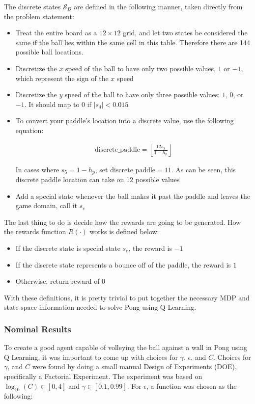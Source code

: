 \documentclass{article}[12pt]
\begin{document}
	The discrete states $\mathcal{S}_D$ are defined in the following manner, taken directly from the problem statement:
	\begin{itemize} 
		\item Treat the entire board as a $12 \times 12$ grid, and let two states be considered the same if the ball lies within the same cell in this table. Therefore there are 144 possible ball locations.
		\item Discretize the $x$ speed of the ball to have only two possible values, $1$ or $-1$, which represent the sign of the $x$ speed
		\item Discretize the $y$ speed of the ball to have only three possible values: $1$, $0$, or $-1$. It should map to $0$ if $|s_4| < 0.015$
		\item To convert your paddle's location into a discrete value, use the following equation: 
		
		\begin{align*} 
		\text{discrete\_paddle} =  \left\lfloor \frac{12 s_5 }{ 1 - h_p } \right\rfloor
		\end{align*} 
		
		In cases where $s_5 = 1 - h_p$, set $\text{discrete\_paddle} = 11$. As can be seen, this discrete paddle location can take on 12 possible values
		\item Add a special state whenever the ball makes it past the paddle and leaves the game domain, call it $s_e$
	\end{itemize}

	The last thing to do is decide how the rewards are going to be generated. How the rewards function $R(\cdot)$ works is defined below:
	\begin{itemize} 
		\item If the discrete state is special state $s_e$, the reward is $-1$
		\item If the discrete state represents a bounce off of the paddle, the reward is $1$
		\item Otherwise, return reward of $0$
	\end{itemize}

	With these definitions, it is pretty trivial to put together the necessary MDP and state-space information needed to solve Pong using Q Learning. 
   
   \subsubsection{Nominal Results} \label{sec:nrvolley1}
   To create a good agent capable of volleying the ball against a wall in Pong using Q Learning, it was important to come up with choices for $\gamma$, $\epsilon$, and $C$. Choices for $\gamma$, and $C$ were found by doing a small manual Design of Experiments (DOE), specifically a Factorial Experiment. The experiment was based on $\log_{10}(C) \in [0,4]$ and $\gamma \in [0.1, 0.99]$. For $\epsilon$, a function was chosen as the following:
   
\end{document}
